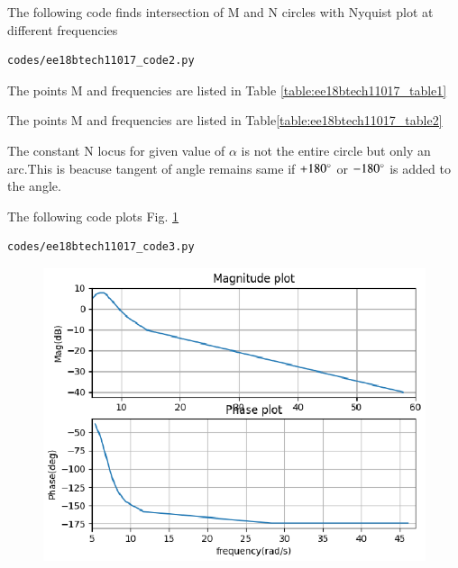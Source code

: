 The following code finds intersection of M and N circles with Nyquist plot at different frequencies
\begin{lstlisting}
codes/ee18btech11017_code2.py
\end{lstlisting}

The points M and frequencies are listed in Table  \ref{table:ee18btech11017_table1}
\begin{table}[!ht]
\centering

\caption{}
\label{table:ee18btech11017_table1}
\end{table}


The points M and frequencies are listed in Table\ref{table:ee18btech11017_table2}
\begin{table}[!ht]
\centering

\caption{}
\label{table:ee18btech11017_table2}
\end{table}

The constant N locus for given value of $\alpha$ is not the entire circle but only an arc.This is beacuse tangent of angle remains same if $+180\degree$ or 
$-180\degree$ is added to the angle.



The following code plots Fig. \ref{fig:ee18btech11017_fig2}
\begin{lstlisting}
codes/ee18btech11017_code3.py
\end{lstlisting}

\begin{figure}[!h]
  \includegraphics[width=\columnwidth]{./figs/ee18btech11017_fig2.eps}
 \caption{}
  \label{fig:ee18btech11017_fig2}
\end{figure}


